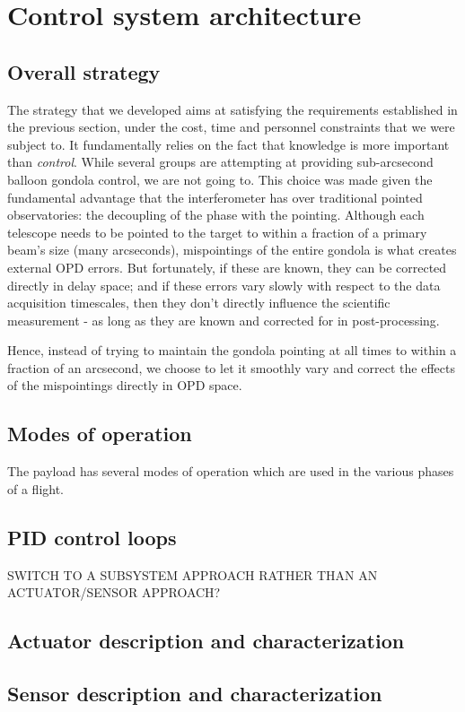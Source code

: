 \section{Control system architecture}
\subsection{Overall strategy}

The strategy that we developed aims at satisfying the requirements established in the previous section, under the cost, time and personnel constraints that we were subject to. It fundamentally relies on the fact that knowledge is more important than \textit{control}. While several groups are attempting at providing sub-arcsecond balloon gondola control, we are not going to. This choice was made given the fundamental advantage that the interferometer has over traditional pointed observatories: the decoupling of the phase with the pointing. Although each telescope needs to be pointed to the target to within a fraction of a primary beam's size (many arcseconds), mispointings of the entire gondola is what creates external OPD errors. But fortunately, if these are known, they can be corrected directly in delay space; and if these errors vary slowly with respect to the data acquisition timescales, then they don't directly influence the scientific measurement - as long as they are known and corrected for in post-processing.

Hence, instead of trying to maintain the gondola pointing at all times to within a fraction of an arcsecond, we choose to let it smoothly vary and correct the effects of the mispointings directly in OPD space.
\subsection{Modes of operation}

The payload has several modes of operation which are used in the various phases of a flight.
\subsection{PID control loops}
SWITCH TO A SUBSYSTEM APPROACH RATHER THAN AN ACTUATOR/SENSOR APPROACH?
\subsection{Actuator description and characterization}
\subsection{Sensor description and characterization}

